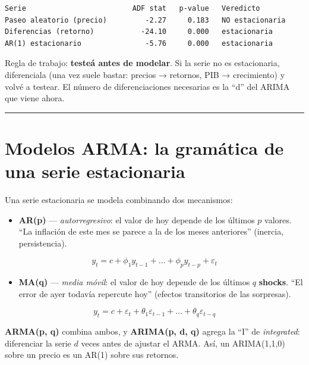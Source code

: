 \documentclass[
  spanish,
  letterpaper,
  DIV=11,
  numbers=noendperiod]{scrreprt}
\providecommand{\tightlist}{%
  \setlength{\itemsep}{0pt}\setlength{\parskip}{0pt}}
\begin{document}
\begin{verbatim}
Serie                         ADF stat   p-value   Veredicto
Paseo aleatorio (precio)         -2.27     0.183   NO estacionaria
Diferencias (retorno)           -24.10     0.000   estacionaria
AR(1) estacionario               -5.76     0.000   estacionaria
\end{verbatim}

Regla de trabajo: \textbf{testeá antes de modelar}. Si la serie no es
estacionaria, diferenciala (una vez suele bastar: precios → retornos,
PIB → crecimiento) y volvé a testear. El número de diferenciaciones
necesarias es la ``d'' del ARIMA que viene ahora.

\begin{center}\rule{0.5\linewidth}{0.5pt}\end{center}

\chapter{Modelos ARMA: la gramática de una serie
estacionaria}\label{modelos-arma-la-gramuxe1tica-de-una-serie-estacionaria}

Una serie estacionaria se modela combinando dos mecanismos:

\begin{itemize}
\tightlist
\item
  \textbf{AR(p)} --- \emph{autorregresivo}: el valor de hoy depende de
  los últimos \(p\) valores. ``La inflación de este mes se parece a la
  de los meses anteriores'' (inercia, persistencia).
\end{itemize}

\[y_t = c + \phi_1 y_{t-1} + \dots + \phi_p y_{t-p} + \varepsilon_t\]

\begin{itemize}
\tightlist
\item
  \textbf{MA(q)} --- \emph{media móvil}: el valor de hoy depende de los
  últimos \(q\) \textbf{shocks}. ``El error de ayer todavía repercute
  hoy'' (efectos transitorios de las sorpresas).
\end{itemize}

\[y_t = c + \varepsilon_t + \theta_1 \varepsilon_{t-1} + \dots + \theta_q \varepsilon_{t-q}\]

\textbf{ARMA(p, q)} combina ambos, y \textbf{ARIMA(p, d, q)} agrega la
``I'' de \emph{integrated}: diferenciar la serie \(d\) veces antes de
ajustar el ARMA. Así, un ARIMA(1,1,0) sobre un precio es un AR(1) sobre
sus retornos.
\end{document}
